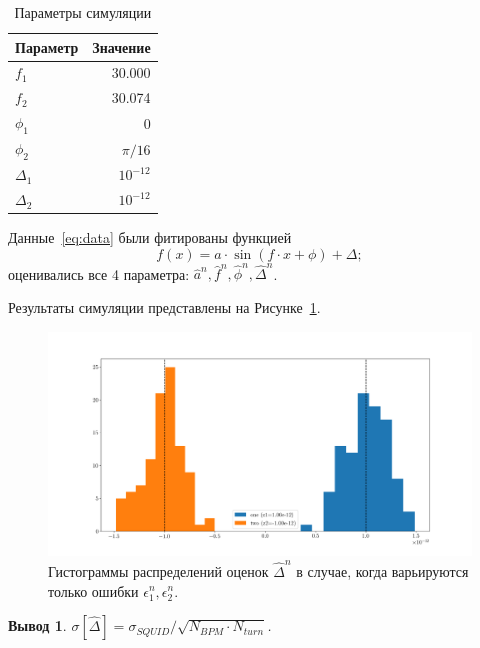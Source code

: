 \documentclass[12pt]{report}
\newcommand{\sigSQUID}{\sigma_{SQUID}}
\newcommand{\ntrl}{n}
\newtheorem{concl}{Вывод}
\begin{document}
\begin{table}[h]\centering
	\caption{Параметры симуляции\label{tbl:sim_param}}
	\begin{tabular}{lr}\hline
		Параметр & Значение \\
		\hline
		$f_1$ & 30.000 \\
		$f_2$ & 30.074\\
		$\phi_1$ & 0 \\
		$\phi_2$ & $\pi/16$ \\
		$\Delta_1$ & $10^{-12}$ \\
		$\Delta_2$ & $10^{-12}$\\
		 \hline
	\end{tabular}
\end{table}

Данные~\eqref{eq:data} были фитированы функцией 
\begin{equation}\label{eq:fit_func}
	f(x) = a\cdot\sin(f\cdot x + \phi) + \Delta;
\end{equation}
оценивались все 4 параметра: $\hat{a}^{\ntrl},\hat{f}^{\ntrl},\hat{\phi}^{\ntrl},\hat{\Delta}^{\ntrl}$.

Результаты симуляции представлены на Рисунке~\ref{fig:vary_only_epsilons}.

\begin{figure}[h]\centering
	\includegraphics[width=\linewidth]{../../img/Koop/CO_offset_b1_b2_hist_vary_epsilons}
	\caption{Гистограммы распределений оценок $\hat{\Delta}^{\ntrl}$ в случае, когда варьируются только ошибки $\epsilon_1^{\ntrl},\epsilon_2^{\ntrl}$. \label{fig:vary_only_epsilons}}
\end{figure}

\begin{concl}
	$\sigma[\hat{\Delta}] = \sigSQUID/\sqrt{N_{BPM}\cdot N_{turn}}$.
\end{concl}
\end{document}
